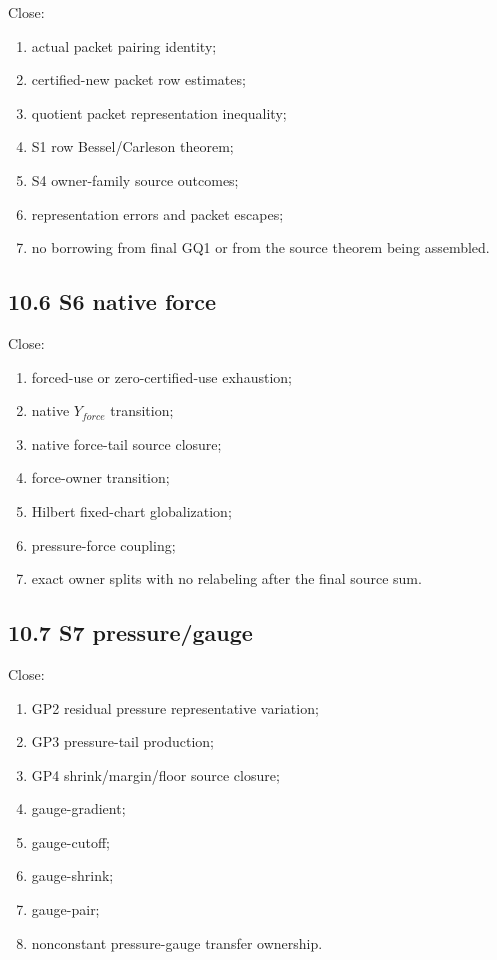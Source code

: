 \documentclass[11pt]{article}
\begin{document}
Close:

\begin{enumerate}
\item
  actual packet pairing identity;
\item
  certified-new packet row estimates;
\item
  quotient packet representation inequality;
\item
  S1 row Bessel/Carleson theorem;
\item
  S4 owner-family source outcomes;
\item
  representation errors and packet escapes;
\item
  no borrowing from final GQ1 or from the source theorem being assembled.
\end{enumerate}

\subsection*{10.6 S6 native force}

Close:

\begin{enumerate}
\item
  forced-use or zero-certified-use exhaustion;
\item
  native \(Y_{force}\) transition;
\item
  native force-tail source closure;
\item
  force-owner transition;
\item
  Hilbert fixed-chart globalization;
\item
  pressure-force coupling;
\item
  exact owner splits with no relabeling after the final source sum.
\end{enumerate}

\subsection*{10.7 S7 pressure/gauge}

Close:

\begin{enumerate}
\item
  GP2 residual pressure representative variation;
\item
  GP3 pressure-tail production;
\item
  GP4 shrink/margin/floor source closure;
\item
  gauge-gradient;
\item
  gauge-cutoff;
\item
  gauge-shrink;
\item
  gauge-pair;
\item
  nonconstant pressure-gauge transfer ownership.
\end{enumerate}
\end{document}
